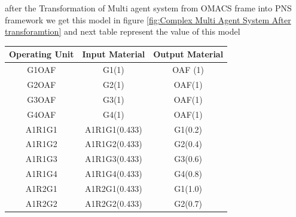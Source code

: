 after the Transformation of Multi agent system from OMACS frame into PNS framework we get this model in figure \ref{fig:Complex Multi Agent System After transforamtion} 
and next table represent the value of this model 

\begin{table}[]
\centering
\begin{tabular}{@{}ccc@{}}
\toprule
\textbf{Operating Unit} & \textbf{Input Material} & \textbf{Output Material}                                                                              \\ \midrule
G1OAF                   & G1(1)                   & OAF (1)                                                                                               \\
G2OAF                   & G2(1)                   & OAF(1)                                                                                                \\
G3OAF                   & G3(1)                   & OAF(1)                                                                                                \\
G4OAF                   & G4(1)                   & OAF(1)                                                                                                \\ \midrule
A1R1G1                  & A1R1G1(0.433)           & G1(0.2)                                                                                               \\
A1R1G2                  & A1R1G2(0.433)           & G2(0.4)                                                                                               \\
A1R1G3                  & A1R1G3(0.433)           & G3(0.6)                                                                                               \\
A1R1G4                  & A1R1G4(0.433)           & G4(0.8)                                                                                               \\
A1R2G1                  & A1R2G1(0.433)           & G1(1.0)                                                                                               \\
A1R2G2                  & A1R2G2(0.433)           & G2(0.7)                                                                                               \\

\end{tabular}
\end{table}
